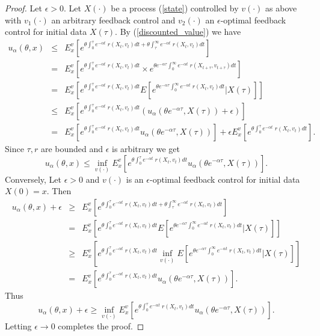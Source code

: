 \documentclass[11pt]{amsart}
\numberwithin{equation}{section}
\begin{document}
\begin{proof}
Let $\epsilon >0$. Let $X(\cdot)$ be a process (\ref{state}) controlled by $v(\cdot)$ as above 
with $v_1(\cdot)$ an arbitrary feedback control and $v_2(\cdot)$ an $\epsilon$-optimal 
 feedback control for initial data $X(\tau)$.
By (\ref{discounted_value}) we have
\begin{eqnarray*}
 u_{\alpha}(\theta,x) &\leq& E^v_x \left[ e^{\theta\int_{0}^{\tau} e^{-\alpha t} \; r(X_t,v_t) dt 
+ \theta \int_{\tau}^{\infty} e^{-\alpha t} \; r(X_t,v_t) dt } \right] \\
&=& E^v_x \left[ e^{\theta\int_{0}^{\tau} e^{-\alpha t} \; r(X_t,v_t) dt }
 \times  e^{ \theta e^{-\alpha \tau} \int_{0}^{\infty} e^{-\alpha t} \; r(X_{t+\tau},v_{t+\tau}) dt } \right] \\
&=& E^v_x \left[ e^{\theta\int_{0}^{\tau} e^{-\alpha t} \; r(X_t,v_t) dt }
  E\left[ e^{ \theta e^{-\alpha \tau} \int_{0}^{\infty} e^{-\alpha t} \; r(X_t,v_t) dt }\Big | X(\tau) \right] \right]\\
&\leq& E^v_x \left[ e^{\theta\int_{0}^{\tau} e^{-\alpha t} \; r(X_t,v_t) dt } 
\left( u_{\alpha}\left(\theta e^{-\alpha \tau}, X(\tau)\right) + \epsilon\right) \right] \\
&=& E^v_x \left[ e^{\theta\int_{0}^{\tau} e^{-\alpha t} \; r(X_t,v_t) dt } 
 u_{\alpha}\left(\theta e^{-\alpha \tau}, X(\tau)\right)  \right] + \epsilon 
E^v_x \left[ e^{\theta\int_{0}^{\tau} e^{-\alpha t} \; r(X_t,v_t) dt }\right] .
\end{eqnarray*}
Since $\tau, r $ are bounded and $\epsilon$ is arbitrary we get
$$
u_{\alpha}(\theta,x) \leq \inf_{v(\cdot)} E^v_x \left[ e^{\theta\int_{0}^{\tau} e^{-\alpha t} \; r(X_t,v_t) dt } 
 u_{\alpha}\left(\theta e^{-\alpha \tau}, X(\tau)\right)  \right].
$$
Conversely, Let $\epsilon>0$ and $v(\cdot)$ is an $\epsilon$-optimal feedback control for initial data $X(0)=x$. Then 
\begin{eqnarray*}
 u_{\alpha}(\theta,x)+\epsilon &\geq& E^v_x\left[ e^{\theta\int_{0}^{\tau} e^{-\alpha t} \; r(X_t,v_t) dt 
+ \theta \int_{\tau}^{\infty} e^{-\alpha t} \; r(X_t,v_t) dt } \right] \\
&=& E^v_x\left[ e^{\theta\int_{0}^{\tau} e^{-\alpha t} \; r(X_t,v_t) dt }
  E\left[ e^{ \theta e^{-\alpha \tau} \int_{0}^{\infty} e^{-\alpha t} \; r(X_t,v_t) dt }\Big | X(\tau) \right] \right]\\
&\geq& E^v_x\left[ e^{\theta\int_{0}^{\tau} e^{-\alpha t} \; r(X_t,v_t) dt }
  \inf_{v(\cdot)} E\left[ e^{ \theta e^{-\alpha \tau} \int_{0}^{\infty} e^{-\alpha t} \; r(X_t,v_t) dt }\Big | X(\tau) \right] \right]\\
&=& E^v_x \left[ e^{\theta\int_{0}^{\tau} e^{-\alpha t} \; r(X_t,v_t) dt } 
 u_{\alpha}\left(\theta e^{-\alpha \tau}, X(\tau)\right) \right] .
\end{eqnarray*}
Thus 
$$
u_{\alpha}(\theta,x)+\epsilon \geq  \inf_{v(\cdot)} E^v_x \left[ e^{\theta\int_{0}^{\tau} e^{-\alpha t} \; r(X_t,v_t) dt } 
 u_{\alpha}\left(\theta e^{-\alpha \tau}, X(\tau)\right)  \right].
$$
Letting $\epsilon\longrightarrow 0$ completes the proof.  
\end{proof}
\end{document}

